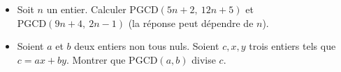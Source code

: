 \begin{itemize}
  \item Soit $n$ un entier. Calculer $\mathrm{PGCD}(5n+2,\ 12n+5)$ et
  $\mathrm{PGCD}(9n+4,\ 2n-1)$ (la réponse peut dépendre de $n$).
  \item Soient $a$ et $b$ deux entiers non tous nuls. Soient $c, x, y$
  trois entiers tels que $c = ax + by$. Montrer que $\mathrm{PGCD}(a, b)$
  divise $c$.
\end{itemize}
